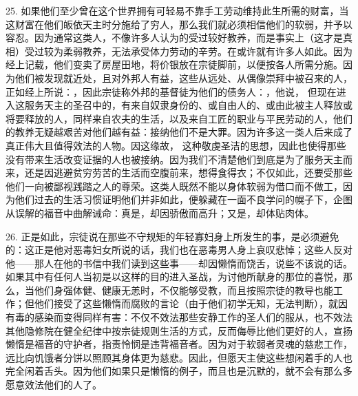 25. 如果他们至少曾在这个世界拥有可轻易不靠手工劳动维持此生所需的财富，当这财富在他们皈依天主时分施给了穷人，那么我们就必须相信他们的软弱，并予以容忍。因为通常这类人，不像许多人认为的受过较好教养，而是事实上（这才是真相）受过较为柔弱教养，无法承受体力劳动的辛劳。在或许就有许多人如此。因为经上记载，他们变卖了房屋田地，将价银放在宗徒脚前，以便按各人所需分施。因为他们被发现就近处，且对外邦人有益，这些从远处、从偶像崇拜中被召来的人，正如经上所说：，因此宗徒称外邦的基督徒为他们的债务人：，他说， 但现在进入这服务天主的圣召中的，有来自奴隶身份的、或自由人的、或由此被主人释放或将要释放的人，同样来自农夫的生活，以及来自工匠的职业与平民劳动的人，他们的教养无疑越艰苦对他们越有益：接纳他们不是大罪。因为许多这一类人后来成了真正伟大且值得效法的人物。因这缘故， 这种敬虔圣洁的思想，因此也使得那些没有带来生活改变证据的人也被接纳。因为我们不清楚他们到底是为了服务天主而来，还是因逃避贫穷劳苦的生活而空腹前来，想得食得衣；不仅如此，还要受那些他们一向被鄙视践踏之人的尊荣。这类人既然不能以身体软弱为借口而不做工，因为他们过去的生活习惯证明他们并非如此，便躲藏在一面不良学问的幌子下，企图从误解的福音中曲解诫命：真是，却因骄傲而高升；又是，却体贴肉体。\par

26. 正是如此，宗徒说在那些不守规矩的年轻寡妇身上所发生的事，是必须避免的：这正是他对恶毒妇女所说的话，我们也在恶毒男人身上哀叹悲悼；这些人反对他——那人在他的书信中我们读到这些事——却因懒惰而饶舌，说些不该说的话。如果其中有任何人当初是以这样的目的进入圣战，为讨他所献身的那位的喜悦，那么，当他们身强体健、健康无恙时，不仅能够受教，而且按照宗徒的教导也能工作；但他们接受了这些懒惰而腐败的言论（由于他们初学无知，无法判断），就因有毒的感染而变得同样有害：不仅不效法那些安静工作的圣人们的服从，也不效法其他隐修院在健全纪律中按宗徒规则生活的方式，反而侮辱比他们更好的人，宣扬懒惰是福音的守护者，指责怜悯是违背福音者。因为对于软弱者灵魂的慈悲工作，远比向饥饿者分饼以照顾其身体更为慈悲。因此，但愿天主使这些想闲着手的人也完全闲着舌头。因为他们如果只是懒惰的例子，而且也是沉默的，就不会有那么多愿意效法他们的人了。\par

